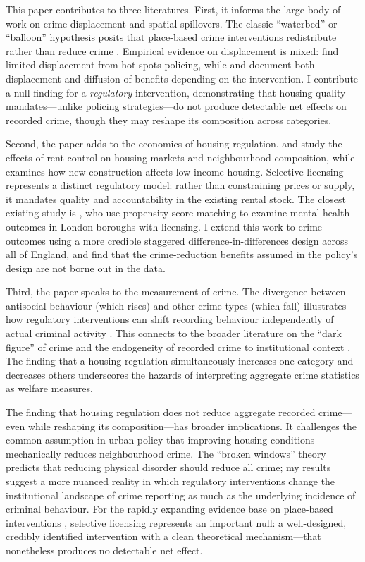 \documentclass[12pt]{article}
\begin{document}
This paper contributes to three literatures. First, it informs the large body of work on crime displacement and spatial spillovers. The classic ``waterbed'' or ``balloon'' hypothesis posits that place-based crime interventions redistribute rather than reduce crime \citep{cornish1987, clarke1995}. Empirical evidence on displacement is mixed: \citet{weisburd2006} find limited displacement from hot-spots policing, while \citet{bowers2011} and \citet{guerette2009} document both displacement and diffusion of benefits depending on the intervention. I contribute a null finding for a \emph{regulatory} intervention, demonstrating that housing quality mandates---unlike policing strategies---do not produce detectable net effects on recorded crime, though they may reshape its composition across categories.

Second, the paper adds to the economics of housing regulation. \citet{autor2014} and \citet{diamond2019} study the effects of rent control on housing markets and neighbourhood composition, while \citet{mast2023} examines how new construction affects low-income housing. Selective licensing represents a distinct regulatory model: rather than constraining prices or supply, it mandates quality and accountability in the existing rental stock. The closest existing study is \citet{jarden2022}, who use propensity-score matching to examine mental health outcomes in London boroughs with licensing. I extend this work to crime outcomes using a more credible staggered difference-in-differences design across all of England, and find that the crime-reduction benefits assumed in the policy's design are not borne out in the data.

Third, the paper speaks to the measurement of crime. The divergence between antisocial behaviour (which rises) and other crime types (which fall) illustrates how regulatory interventions can shift recording behaviour independently of actual criminal activity \citep{skogan1990}. This connects to the broader literature on the ``dark figure'' of crime and the endogeneity of recorded crime to institutional context \citep{buil-gil2021}. The finding that a housing regulation simultaneously increases one category and decreases others underscores the hazards of interpreting aggregate crime statistics as welfare measures.

The finding that housing regulation does not reduce aggregate recorded crime---even while reshaping its composition---has broader implications. It challenges the common assumption in urban policy that improving housing conditions mechanically reduces neighbourhood crime. The ``broken windows'' theory \citep{wilson1982} predicts that reducing physical disorder should reduce all crime; my results suggest a more nuanced reality in which regulatory interventions change the institutional landscape of crime reporting as much as the underlying incidence of criminal behaviour. For the rapidly expanding evidence base on place-based interventions \citep{braga2014}, selective licensing represents an important null: a well-designed, credibly identified intervention with a clean theoretical mechanism---that nonetheless produces no detectable net effect.
\end{document}
